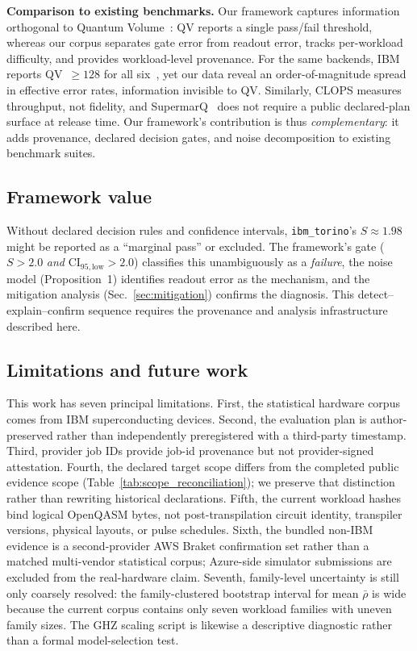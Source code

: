 \documentclass[aps,prxquantum,twocolumn,superscriptaddress,amsmath,amssymb,longbibliography,floatfix]{revtex4-2}
\begin{document}
\textbf{Comparison to existing benchmarks.} Our framework captures information orthogonal to Quantum Volume~\cite{Cross2019}: QV reports a single pass/fail threshold, whereas our corpus separates gate error from readout error, tracks per-workload difficulty, and provides workload-level provenance. For the same backends, IBM reports QV~$\geq 128$ for all six~\cite{IBM2024}, yet our data reveal an order-of-magnitude spread in effective error rates, information invisible to QV. Similarly, CLOPS measures throughput, not fidelity, and SupermarQ~\cite{Tomesh2022} does not require a public declared-plan surface at release time. Our framework's contribution is thus \emph{complementary}: it adds provenance, declared decision gates, and noise decomposition to existing benchmark suites.

\subsection{Framework value}

Without declared decision rules and confidence intervals, \texttt{ibm\_torino}'s $S \approx 1.98$ might be reported as a ``marginal pass'' or excluded. The framework's gate ($S > 2.0$ \emph{and} $\mathrm{CI}_{95,\text{low}} > 2.0$) classifies this unambiguously as a \emph{failure}, the noise model (Proposition~1) identifies readout error as the mechanism, and the mitigation analysis (Sec.~\ref{sec:mitigation}) confirms the diagnosis. This detect--explain--confirm sequence requires the provenance and analysis infrastructure described here.

\subsection{Limitations and future work}

This work has seven principal limitations. First, the statistical hardware corpus comes from IBM superconducting devices. Second, the evaluation plan is author-preserved rather than independently preregistered with a third-party timestamp. Third, provider job IDs provide job-id provenance but not provider-signed attestation. Fourth, the declared target scope differs from the completed public evidence scope (Table~\ref{tab:scope_reconciliation}); we preserve that distinction rather than rewriting historical declarations. Fifth, the current workload hashes bind logical OpenQASM bytes, not post-transpilation circuit identity, transpiler versions, physical layouts, or pulse schedules. Sixth, the bundled non-IBM evidence is a second-provider AWS Braket confirmation set rather than a matched multi-vendor statistical corpus; Azure-side simulator submissions are excluded from the real-hardware claim. Seventh, family-level uncertainty is still only coarsely resolved: the family-clustered bootstrap interval for mean $\bar{\rho}$ is wide because the current corpus contains only seven workload families with uneven family sizes. The GHZ scaling script is likewise a descriptive diagnostic rather than a formal model-selection test.
\end{document}
